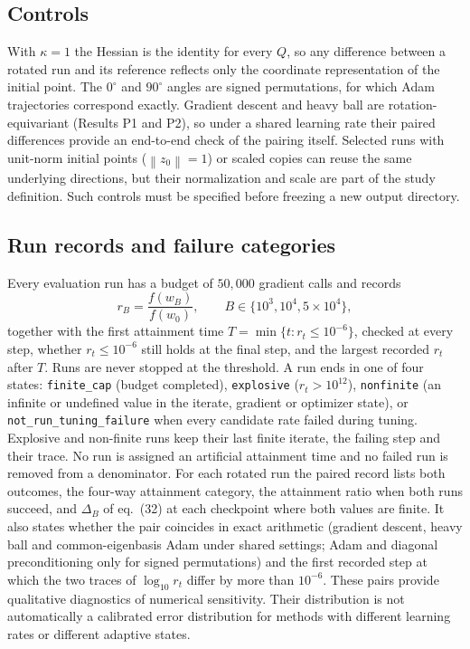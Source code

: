 \documentclass[11pt,a4paper]{article}
\newcommand{\norm}[1]{\left\lVert#1\right\rVert}
\newcommand{\code}[1]{\texttt{#1}}
\begin{document}
\subsection{Controls}\label{sec:controls}
With $\kappa=1$ the Hessian is the identity for every $Q$, so any difference
between a rotated run and its reference reflects only the coordinate
representation of the initial point. The $0^\circ$ and $90^\circ$ angles are
signed permutations, for which Adam trajectories correspond exactly.
Gradient descent and heavy ball are rotation-equivariant (Results P1 and P2),
so under a shared learning rate their paired differences provide an end-to-end
check of the pairing itself. Selected runs with unit-norm initial points
($\norm{z_0}=1$) or scaled copies can reuse the same underlying directions,
but their normalization and scale are part of the study definition. Such
controls must be specified before freezing a new output directory.

\subsection{Run records and failure categories}\label{sec:records}
Every evaluation run has a budget of $50{,}000$ gradient calls and records
\begin{equation}
  r_B=\frac{f(w_B)}{f(w_0)},\qquad B\in\{10^3,10^4,5\times 10^4\},
\end{equation}
together with the first attainment time $T=\min\{t:r_t\le 10^{-6}\}$, checked at
every step, whether $r_t\le10^{-6}$ still holds at the final step, and the
largest recorded $r_t$ after $T$. Runs are never stopped at the threshold. A
run ends in one of four states: \code{finite\_cap} (budget completed),
\code{explosive} ($r_t>10^{12}$), \code{nonfinite} (an infinite or undefined
value in the iterate, gradient or optimizer state), or
\code{not\_run\_tuning\_failure} when every candidate rate failed during
tuning. Explosive and non-finite runs keep their last finite iterate, the
failing step and their trace. No run is assigned an artificial attainment time
and no failed run is removed from a denominator. For each rotated run the
paired record lists both outcomes, the four-way attainment category, the
attainment ratio when both runs succeed, and $\Delta_B$ of eq.~(32) at each
checkpoint where both values are finite. It also states whether the pair
coincides in exact arithmetic (gradient descent, heavy ball and
common-eigenbasis Adam under shared settings; Adam and diagonal
preconditioning only for signed permutations) and the first recorded step at
which the two traces of $\log_{10} r_t$ differ by more than $10^{-6}$. These
pairs provide qualitative diagnostics of numerical sensitivity. Their
distribution is not automatically a calibrated error distribution for methods
with different learning rates or different adaptive states.
\end{document}
